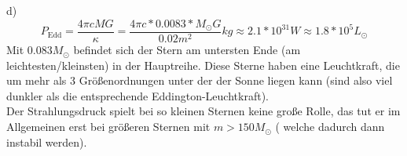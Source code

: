 \documentclass[11pt, a4paper]{article}
\begin{document}
\newpage
\setlength{\headheight}{0cm}
\par{d)}
\[
	P_\text{Edd} = \frac{4\pi c MG}{\kappa} 
	= \frac{4\pi c  * 0.0083 * M_\odot G}{0.02m^2}kg
	\approx 2.1 * 10^{31} W
	\approx 1.8 * 10^5 L_\odot
\]
Mit $0.083 M_\odot$ befindet sich der Stern am untersten Ende (am 
leichtesten/kleinsten) in der Hauptreihe.  Diese Sterne haben eine 
Leuchtkraft, die um mehr als 3 Größenordnungen unter der der Sonne liegen 
kann (sind also viel dunkler als die entsprechende Eddington-Leuchtkraft).\\
Der Strahlungsdruck spielt bei so kleinen Sternen keine große Rolle, das 
tut er im Allgemeinen erst bei größeren Sternen mit $m > 150 M_\odot$ (
welche dadurch dann instabil werden).
\end{document}
